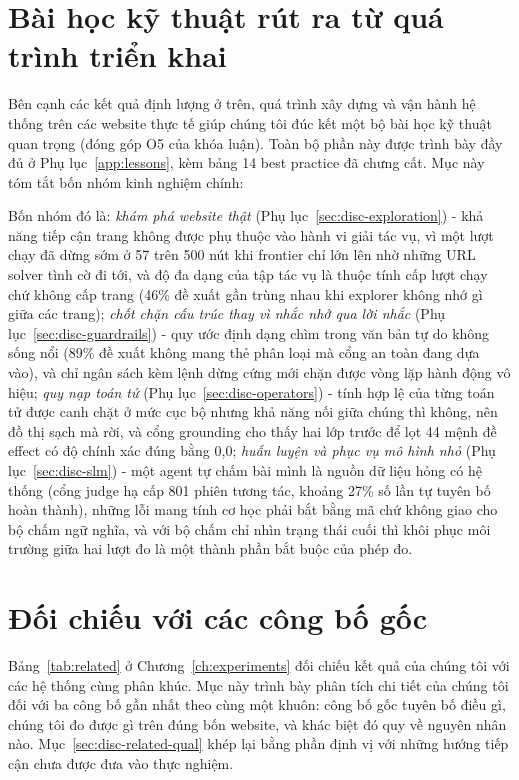 \section{Bài học kỹ thuật rút ra từ quá trình triển khai}
\label{sec:disc-lessons}

Bên cạnh các kết quả định lượng ở trên, quá trình xây dựng và vận hành hệ thống trên các website thực tế giúp chúng tôi đúc kết một bộ bài học kỹ thuật quan trọng (đóng góp O5 của khóa luận). Toàn bộ phần này được trình bày đầy đủ ở Phụ lục~\ref{app:lessons}, kèm bảng 14 best practice đã chưng cất. Mục này tóm tắt bốn nhóm kinh nghiệm chính:

Bốn nhóm đó là: \emph{khám phá website thật} (Phụ lục~\ref{sec:disc-exploration}) - khả năng tiếp cận trang không được phụ thuộc vào hành vi giải tác vụ, vì một lượt chạy đã dừng sớm ở 57 trên 500 nút khi frontier chỉ lớn lên nhờ những URL solver tình cờ đi tới, và độ đa dạng của tập tác vụ là thuộc tính cấp lượt chạy chứ không cấp trang (46\% đề xuất gần trùng nhau khi explorer không nhớ gì giữa các trang); \emph{chốt chặn cấu trúc thay vì nhắc nhở qua lời nhắc} (Phụ lục~\ref{sec:disc-guardrails}) - quy ước định dạng chìm trong văn bản tự do không sống nổi (89\% đề xuất không mang thẻ phân loại mà cổng an toàn đang dựa vào), và chỉ ngân sách kèm lệnh dừng cứng mới chặn được vòng lặp hành động vô hiệu; \emph{quy nạp toán tử} (Phụ lục~\ref{sec:disc-operators}) - tính hợp lệ của từng toán tử được canh chặt ở mức cục bộ nhưng khả năng nối giữa chúng thì không, nên đồ thị sạch mà rời, và cổng grounding cho thấy hai lớp trước để lọt 44 mệnh đề effect có độ chính xác đúng bằng 0{,}0; \emph{huấn luyện và phục vụ mô hình nhỏ} (Phụ lục~\ref{sec:disc-slm}) - một agent tự chấm bài mình là nguồn dữ liệu hỏng có hệ thống (cổng judge hạ cấp 801 phiên tương tác, khoảng 27\% số lần tự tuyên bố hoàn thành), những lỗi mang tính cơ học phải bắt bằng mã chứ không giao cho bộ chấm ngữ nghĩa, và với bộ chấm chỉ nhìn trạng thái cuối thì khôi phục môi trường giữa hai lượt đo là một thành phần bắt buộc của phép đo.

\section{Đối chiếu với các công bố gốc}
\label{sec:disc-related}

Bảng~\ref{tab:related} ở Chương~\ref{ch:experiments} đối chiếu kết quả của chúng tôi với các hệ thống cùng phân khúc. Mục này trình bày phân tích chi tiết của chúng tôi đối với ba công bố gần nhất theo cùng một khuôn: công bố gốc tuyên bố điều gì, chúng tôi đo được gì trên đúng bốn website, và khác biệt đó quy về nguyên nhân nào. Mục~\ref{sec:disc-related-qual} khép lại bằng phần định vị với những hướng tiếp cận chưa được đưa vào thực nghiệm.

